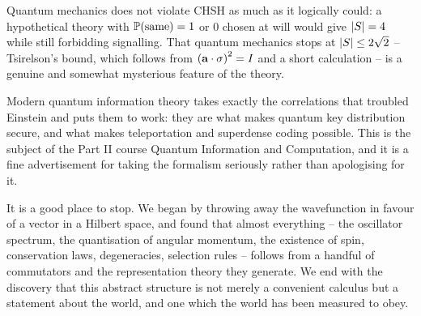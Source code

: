 \documentclass[a4paper]{scrartcl}
\begin{document}
\begin{remark}
    Quantum mechanics does not violate CHSH as much as it logically could: a hypothetical theory with $\mathbb{P}(\text{same}) = 1$ or $0$ chosen at will would give $\lvert S\rvert = 4$ while still forbidding signalling. That quantum mechanics stops at $\lvert S\rvert\leq2\sqrt2$ -- Tsirelson's bound, which follows from $\left(\mathbf{a}\cdot\mathbf{\sigma}\right)^2 = I$ and a short calculation -- is a genuine and somewhat mysterious feature of the theory.
\end{remark}

\begin{remark}
    Modern quantum information theory takes exactly the correlations that troubled Einstein and puts them to work: they are what makes quantum key distribution secure, and what makes teleportation and superdense coding possible. This is the subject of the Part II course Quantum Information and Computation, and it is a fine advertisement for taking the formalism seriously rather than apologising for it.
\end{remark}

It is a good place to stop. We began by throwing away the wavefunction in favour of a vector in a Hilbert space, and found that almost everything -- the oscillator spectrum, the quantisation of angular momentum, the existence of spin, conservation laws, degeneracies, selection rules -- follows from a handful of commutators and the representation theory they generate. We end with the discovery that this abstract structure is not merely a convenient calculus but a statement about the world, and one which the world has been measured to obey.
\end{document}
